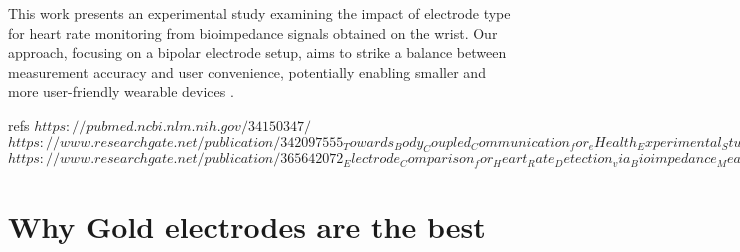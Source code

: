 {This work presents an experimental study examining the impact of electrode type for heart rate monitoring from bioimpedance signals obtained on the wrist. Our approach, focusing on a bipolar electrode setup, aims to strike a balance between measurement accuracy and user convenience, potentially enabling smaller and more user-friendly wearable devices \cite{towards}.

refs{
$https://pubmed.ncbi.nlm.nih.gov/34150347/$
$https://www.researchgate.net/publication/342097555_Towards_Body_Coupled_Communication_for_eHealth_Experimental_Study_of_Human_Body_Frequency_Response$
$https://www.researchgate.net/publication/365642072_Electrode_Comparison_for_Heart_Rate_Detection_via_Bioimpedance_Measurements$}

}

\section{Why Gold electrodes are the best}
